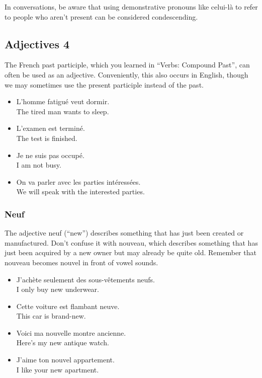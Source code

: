 In conversations, be aware that using demonstrative pronouns like celui-l{\`a} to refer to people who aren't present can be considered condescending.


\pagebreak
\subsection{Adjectives 4}

The French past participle, which you learned in ``Verbs: Compound Past'', can often be used as an adjective. Conveniently, this also occurs in English, though we may sometimes use the present participle instead of the past.

\begin{itemize}
  \item  L'homme fatigu{\'e} veut dormir. \\ The tired man wants to sleep.
	\item  L'examen est termin{\'e}. \\ The test is finished.
	\item  Je ne suis pas occup{\'e}. \\ I am not busy.
	\item  On va parler avec les parties int{\'e}ress{\'e}es. \\ We will speak with the interested parties.
\end{itemize}


\subsubsection{Neuf}

The adjective neuf (``new'') describes something that has just been created or manufactured. Don't confuse it with nouveau, which describes something that has just been acquired by a new owner but may already be quite old. Remember that nouveau becomes nouvel in front of vowel sounds.

\begin{itemize}
  \item  J'ach{\`e}te seulement des sous-v{\^e}tements neufs. \\ I only buy new underwear.
	\item  Cette voiture est flambant neuve. \\ This car is brand-new.
	\item  Voici ma nouvelle montre ancienne. \\ Here's my new antique watch.
	\item  J'aime ton nouvel appartement. \\ I like your new apartment.
\end{itemize}

